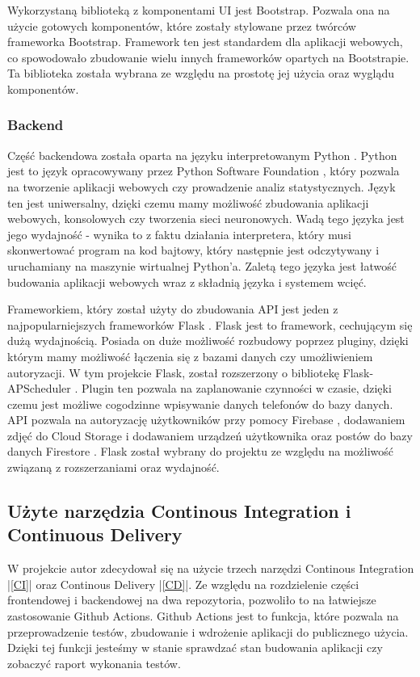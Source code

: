 Wykorzystaną biblioteką z komponentami UI jest Bootstrap. Pozwala ona na użycie gotowych komponentów, które zostały stylowane przez twórców frameworka Bootstrap. Framework ten jest standardem dla aplikacji webowych, co spowodowało zbudowanie wielu innych frameworków opartych na Bootstrapie. Ta biblioteka została wybrana ze względu na prostotę jej użycia oraz wyglądu komponentów. 

\subsubsection{Backend}
Część backendowa została oparta na języku interpretowanym Python \cite{python}. Python jest to język opracowywany przez Python Software Foundation \cite{psf}, który pozwala na tworzenie aplikacji webowych czy prowadzenie analiz statystycznych. Język ten jest uniwersalny, dzięki czemu mamy możliwość zbudowania aplikacji webowych, konsolowych czy tworzenia sieci neuronowych. Wadą tego języka jest jego wydajność - wynika to z faktu działania interpretera, który musi skonwertować program na kod bajtowy, który następnie jest odczytywany i uruchamiany na maszynie wirtualnej Python'a. Zaletą tego języka jest łatwość budowania aplikacji webowych wraz z składnią języka i systemem wcięć.

Frameworkiem, który został użyty do zbudowania API jest jeden z najpopularniejszych frameworków Flask \cite{flask}. Flask jest to framework, cechującym się dużą wydajnością. Posiada on duże możliwość rozbudowy poprzez pluginy, dzięki którym mamy możliwość łączenia się z bazami danych czy umożliwieniem autoryzacji. W tym projekcie Flask, został rozszerzony o bibliotekę Flask-APScheduler \cite{flask_apscheduler}. Plugin ten pozwala na zaplanowanie czynności w czasie, dzięki czemu jest możliwe cogodzinne wpisywanie danych telefonów do bazy danych. API pozwala na autoryzację użytkowników przy pomocy Firebase \cite{firebase}, dodawaniem zdjęć do Cloud Storage \cite{cloud_storage} i dodawaniem urządzeń użytkownika oraz postów do bazy danych Firestore \cite{firestore}. Flask został wybrany do projektu ze względu na możliwość związaną z rozszerzaniami oraz wydajność.

\subsection{Użyte narzędzia Continous Integration i Continuous Delivery}
W projekcie autor zdecydował się na użycie trzech narzędzi Continous Integration |\ref{CI}| oraz Continous Delivery |\ref{CD}|. Ze względu na rozdzielenie części frontendowej i backendowej na dwa repozytoria, pozwoliło to na łatwiejsze zastosowanie Github Actions. Github Actions \cite{github_actions} jest to funkcja, które pozwala na przeprowadzenie testów, zbudowanie i wdrożenie aplikacji do publicznego użycia. Dzięki tej funkcji jesteśmy w stanie sprawdzać stan budowania aplikacji czy zobaczyć raport wykonania testów.

